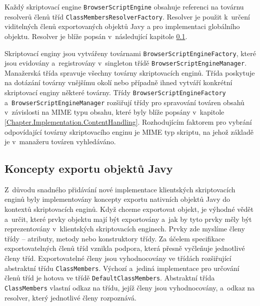 Každý skriptovací engine \texttt{BrowserScriptEngine} obsahuje referenci na továrnu resolverů členů tříd \texttt{ClassMembersResolverFactory}. Resolver je použit k~určení viditelných členů exportovaných objektů Javy a pro implementaci globálního objektu. Resolver je blíže popsán v~následující kapitole \ref{Chapter.Implementation.ExportConcepts}. 

Skriptovací enginy jsou vytvářeny továrnami \texttt{BrowserScriptEngineFactory}, které jsou evidovány a~registrovány v~singleton třídě \texttt{BrowserScriptEngineManager}. Manažerská třída spravuje všechny továrny skriptovacích enginů. Třída poskytuje na dotázání továrny vnějšímu okolí nebo případně ihned vytváří konkrétní skriptovací enginy některé továrny. Třídy \texttt{BrowserScriptEngineFactory} a~\texttt{BrowserScriptEngineManager} rozšiřují třídy pro spravování továren obsahů v~závislosti na MIME typu obsahu, které byly blíže popsány v~kapitole \ref{Chapter.Implementation.ContentHandling}. Rozhodujícím faktorem pro vybrání odpovídající továrny skriptovacího enginu je MIME typ skriptu, na jehož základě je v~manažeru továren vyhledáváno.

\subsection{Koncepty exportu objektů Javy}
\label{Chapter.Implementation.ExportConcepts}

Z~důvodu snadného přidávání nové implementace klientských skriptovacích enginů byly implementovány koncepty exportu nativních objektů Javy do kontextů skriptovacích enginů. Když chceme exportovat objekt, je výhodné vědět a~určit, které prvky objektu mají být exportovány a~jak by tyto prvky měly být reprezentovány v~klientských skriptovacích enginech. Prvky zde myslíme členy třídy -- atributy, metody nebo konstruktory třídy. Za účelem specifikace exportovatelných členů tříd vznikla podpora, která přesně vyčleňuje jednotlivé členy tříd. Exportovatelné členy jsou vyhodnocovány ve třídách rozšiřující abstraktní třídu \texttt{ClassMembers}. Výchozí a~jediná implementace pro určování členů tříd je hotova ve třídě \texttt{DefaultClassMembers}. Abstraktní třída \texttt{ClassMembers} vlastní odkaz na třídu, jejíž členy jsou vyhodnocovány, a~odkaz na resolver, který jednotlivé členy rozpoznává. 

